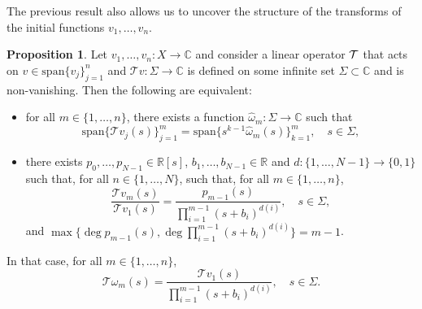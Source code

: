 \documentclass[a4paper,12pt,oneside]{article}
\theoremstyle{definition}
\newtheorem{prop}[defi]{Proposition}
\newcommand{\C}{\mathbb{C}}
\newcommand{\R}{\mathbb{R}}
\newcommand{\om}{\omega}
\newcommand{\spn}[1]{\text{span}\{#1\}}
\newcommand{\T}[1]{\mathcal{T}#1}
\begin{document}
The previous result also allows us to uncover the structure of the transforms of the initial functions $v_1,\dots,v_n$.

\begin{prop} \label{DT_ALG}
    Let $v_1,\dots,v_n:X\to\C$ and consider a linear operator $\T$ that acts on $v\in \spn{v_j}_{j=1}^n$ and $\T{v}:\Sigma\to\C$ is defined on some infinite set $\Sigma\subset\C$ and is non-vanishing. Then the following are equivalent: 
    \begin{itemize}
        \item[$i)$] for all $m\in\{1,\dots,n\}$, there exists a function $\hat{\om}_m:\Sigma\to\C$ such that
        $$\spn{\T{v_j}(s)}_{j=1}^{m} = \spn{ s^{k-1} \hat{\om}_m(s)}_{k=1}^{m},\quad s\in\Sigma,$$
        \item[$ii)$] there exists $p_0,\dots,p_{N-1}\in\R[s]$, $b_1,\dots,b_{N-1}\in\R$ and $d:\{1,\dots,N-1\}\to\{0,1\}$ such that, for all $n\in\{1,\dots,N\}$, such that, for all $m\in\{1,\dots,n\}$,
        $$ \frac{\T{v_m}(s)}{\T{v_1}(s)} = \frac{p_{m-1}(s)}{\prod_{i=1}^{m-1}(s+b_i)^{d(i)}},\quad s\in\Sigma, $$
    and $\max\{\deg p_{m-1}(s),\deg \prod_{i=1}^{m-1}(s+b_i)^{d(i)}\}=m-1$.
    \end{itemize}
    In that case, for all $m\in\{1,\dots,n\}$,
    $$ \T{\om_m}(s) = \frac{\T{v_1}(s)}{\prod_{i=1}^{m-1} (s+b_i)^{d(i)}},\quad s\in\Sigma.$$
\end{prop}
\end{document}
